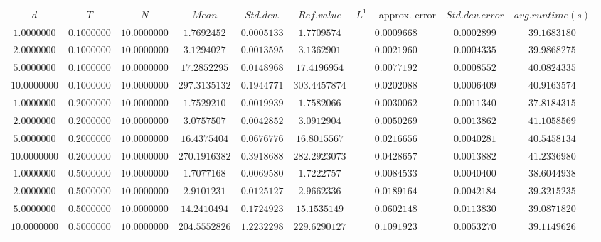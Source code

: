 \begin{tabular}{ccccccccc}
$d$ & $T$ & $N$ & $Mean$ & $Std. dev.$ & $Ref. value$ & $L^1-$approx. error & $Std. dev. error$ & $avg. runtime (s)$\\
$1.0000000$ & $0.1000000$ & $10.0000000$ & $1.7692452$ & $0.0005133$ & $1.7709574$ & $0.0009668$ & $0.0002899$ & $39.1683180$\\
$2.0000000$ & $0.1000000$ & $10.0000000$ & $3.1294027$ & $0.0013595$ & $3.1362901$ & $0.0021960$ & $0.0004335$ & $39.9868275$\\
$5.0000000$ & $0.1000000$ & $10.0000000$ & $17.2852295$ & $0.0148968$ & $17.4196954$ & $0.0077192$ & $0.0008552$ & $40.0824335$\\
$10.0000000$ & $0.1000000$ & $10.0000000$ & $297.3135132$ & $0.1944771$ & $303.4457874$ & $0.0202088$ & $0.0006409$ & $40.9163574$\\
$1.0000000$ & $0.2000000$ & $10.0000000$ & $1.7529210$ & $0.0019939$ & $1.7582066$ & $0.0030062$ & $0.0011340$ & $37.8184315$\\
$2.0000000$ & $0.2000000$ & $10.0000000$ & $3.0757507$ & $0.0042852$ & $3.0912904$ & $0.0050269$ & $0.0013862$ & $41.1058569$\\
$5.0000000$ & $0.2000000$ & $10.0000000$ & $16.4375404$ & $0.0676776$ & $16.8015567$ & $0.0216656$ & $0.0040281$ & $40.5458134$\\
$10.0000000$ & $0.2000000$ & $10.0000000$ & $270.1916382$ & $0.3918688$ & $282.2923073$ & $0.0428657$ & $0.0013882$ & $41.2336980$\\
$1.0000000$ & $0.5000000$ & $10.0000000$ & $1.7077168$ & $0.0069580$ & $1.7222757$ & $0.0084533$ & $0.0040400$ & $38.6044938$\\
$2.0000000$ & $0.5000000$ & $10.0000000$ & $2.9101231$ & $0.0125127$ & $2.9662336$ & $0.0189164$ & $0.0042184$ & $39.3215235$\\
$5.0000000$ & $0.5000000$ & $10.0000000$ & $14.2410494$ & $0.1724923$ & $15.1535149$ & $0.0602148$ & $0.0113830$ & $39.0871820$\\
$10.0000000$ & $0.5000000$ & $10.0000000$ & $204.5552826$ & $1.2232298$ & $229.6290127$ & $0.1091923$ & $0.0053270$ & $39.1149626$\\
\end{tabular}
